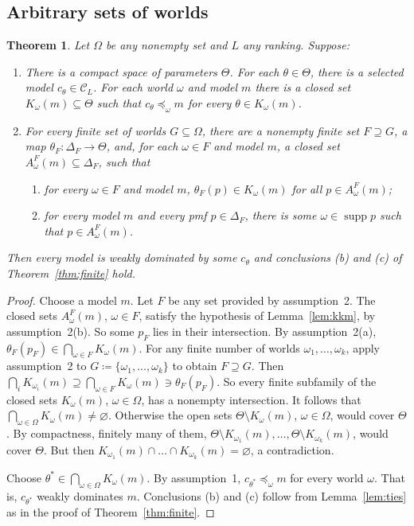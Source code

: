 \documentclass[11pt]{article}
\newtheorem{theorem}{Theorem}[section]
\theoremstyle{definition}
\newcommand{\C}{\mathcal C}
\newcommand{\supp}{\operatorname{supp}}
\begin{document}
\subsection{Arbitrary sets of worlds}

\begin{theorem}\label{thm:local}
Let $\Omega$ be any nonempty set and $L$ any ranking. Suppose:
\begin{enumerate}[label=\arabic*.,leftmargin=*]
\item There is a compact space of parameters $\Theta$. For each $\theta\in\Theta$, there is a selected model $c_\theta\in\C_L$. For each world $\omega$ and model $m$ there is a closed set $K_\omega(m)\subseteq\Theta$ such that $c_\theta\preceq_\omega m$ for every $\theta\in K_\omega(m)$.
\item For every finite set of worlds $G\subseteq\Omega$, there are a nonempty finite set $F\supseteq G$, a map $\theta_F:\Delta_F\to\Theta$, and, for each $\omega\in F$ and model $m$, a closed set $A^F_\omega(m)\subseteq\Delta_F$, such that
\begin{enumerate}[label=(\alph*)]
\item for every $\omega\in F$ and model $m$, $\theta_F(p)\in K_\omega(m)$ for all $p\in A^F_\omega(m)$;
\item for every model $m$ and every pmf $p\in\Delta_F$, there is some $\omega\in\supp p$ such that $p\in A^F_\omega(m)$.
\end{enumerate}
\end{enumerate}
Then every model is weakly dominated by some $c_\theta$ and conclusions (b) and (c) of Theorem~\ref{thm:finite} hold.
\end{theorem}
\begin{proof}
Choose a model $m$. Let $F$ be any set provided by assumption~2. The closed sets $A^F_\omega(m)$, $\omega\in F$, satisfy the hypothesis of Lemma~\ref{lem:kkm}, by assumption~2(b). So some $p_F$ lies in their intersection. By assumption~2(a), $\theta_F(p_F)\in\bigcap_{\omega\in F}K_\omega(m)$. For any finite number of worlds $\omega_1,\dots,\omega_k$, apply assumption~2 to $G\coloneqq\{\omega_1,\dots,\omega_k\}$ to obtain $F\supseteq G$. Then $\bigcap_iK_{\omega_i}(m)\supseteq\bigcap_{\omega\in F}K_\omega(m)\ni\theta_F(p_F)$. So every finite subfamily of the closed sets $K_\omega(m)$, $\omega\in\Omega$, has a nonempty intersection. It follows that $\bigcap_{\omega\in\Omega}K_\omega(m)\ne\varnothing$. Otherwise the open sets $\Theta\setminus K_\omega(m)$, $\omega\in\Omega$, would cover $\Theta$. By compactness, finitely many of them, $\Theta\setminus K_{\omega_1}(m),\dots,\Theta\setminus K_{\omega_k}(m)$, would cover $\Theta$. But then $K_{\omega_1}(m)\cap\dots\cap K_{\omega_k}(m)=\varnothing$, a contradiction. 

Choose $\theta^*\in\bigcap_{\omega\in\Omega}K_\omega(m)$. By assumption~1, $c_{\theta^*}\preceq_\omega m$ for every world $\omega$. That is, $c_{\theta^*}$ weakly dominates $m$. Conclusions (b) and (c) follow from Lemma~\ref{lem:ties} as in the proof of Theorem~\ref{thm:finite}.
\end{proof}
\end{document}

